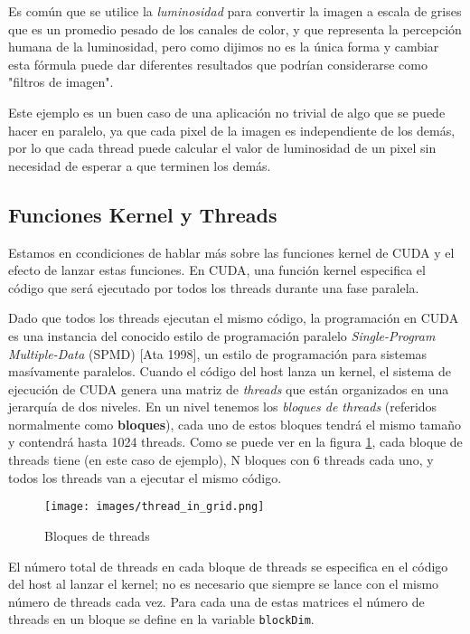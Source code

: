 Es común que se utilice la \textit{luminosidad} para convertir la imagen a escala de grises que es un promedio pesado de
los canales de color, y que representa la percepción humana de la luminosidad, pero como dijimos no es la única forma y
cambiar esta fórmula puede dar diferentes resultados que podrían considerarse como "filtros de imagen".

Este ejemplo es un buen caso de una aplicación no trivial de algo que se puede hacer en paralelo, ya que cada pixel de
la imagen es independiente de los demás, por lo que cada thread puede calcular el valor de luminosidad de un pixel sin
necesidad de esperar a que terminen los demás.

\subsection{Funciones Kernel y Threads}

Estamos en ccondiciones de hablar más sobre las funciones kernel de CUDA y el efecto de lanzar estas funciones. En CUDA,
una función kernel especifica el código que será ejecutado por todos los threads durante una fase paralela.

Dado que todos los threads ejecutan el mismo código, la programación en CUDA es una instancia del conocido estilo de
programación paralelo \textit{Single-Program Multiple-Data} (SPMD) [Ata 1998], un estilo de programación para sistemas
masívamente paralelos. Cuando el código del host lanza un kernel, el sistema de ejecución de CUDA genera una matriz de
\textit{threads} que están organizados en una jerarquía de dos niveles. En un nivel tenemos los \textit{bloques de
threads} (referidos normalmente como \textbf{bloques}), cada uno de estos bloques tendrá el mismo tamaño y contendrá
hasta 1024 threads. Como se puede ver en la figura \ref{fig:thread_blocks}, cada bloque de threads tiene (en este caso
de ejemplo), N bloques con 6 threads cada uno, y todos los threads van a ejecutar el mismo código.

\begin{figure}[H]
  \centering
  \texttt{[image: images/thread\_in\_grid.png]}
  \caption{Bloques de threads}
  \label{fig:thread_blocks}
\end{figure}

El número total de threads en cada bloque de threads se especifica en el código del host al lanzar el kernel; no es
necesario que siempre se lance con el mismo número de threads cada vez. Para cada una de estas matrices el número de
threads en un bloque se define en la variable \texttt{blockDim}.

